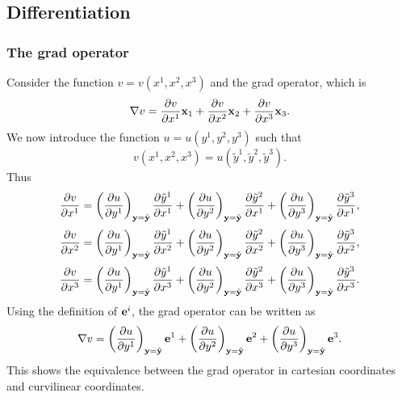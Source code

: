 \documentclass[11pt]{article}
\newcommand{\ytilde}{\tilde{y}}
\begin{document}
\subsection{Differentiation}
\subsubsection{The grad operator}
Consider the function $v = v(x^1, x^2, x^3)$ and the grad operator, which is  
\begin{equation}
    \nabla v = \frac{\partial v}{\partial x^1} \mathbf{x}_1 + \frac{\partial v}{\partial x^2} \mathbf{x}_2 + \frac{\partial v}{\partial x^3} \mathbf{x}_3.
\end{equation}
We now introduce the function $u = u(y^1,y^2,y^3)$ such that 
\begin{equation}
    v(x^1, x^2, x^3) = u(\ytilde^1, \ytilde^2, \ytilde^3).
\end{equation}
Thus
\begin{equation}
    \frac{\partial v}{\partial x^1} 
    = \left( \frac{ \partial u}{\partial y^1} \right)_{\yvec = \tilde{\yvec}} \frac{\partial \ytilde^1}{\partial x^1} 
    + \left( \frac{ \partial u}{\partial y^2} \right)_{\yvec = \tilde{\yvec}} \frac{\partial \ytilde^2}{\partial x^1} 
    + \left( \frac{ \partial u}{\partial y^3} \right)_{\yvec = \tilde{\yvec}} \frac{\partial \ytilde^3}{\partial x^1}, 
\end{equation}
\begin{equation}
    \frac{\partial v}{\partial x^2} 
    = \left( \frac{ \partial u}{\partial y^1} \right)_{\yvec = \tilde{\yvec}} \frac{\partial \ytilde^1}{\partial x^2} 
    + \left( \frac{ \partial u}{\partial y^2} \right)_{\yvec = \tilde{\yvec}} \frac{\partial \ytilde^2}{\partial x^2} 
    + \left( \frac{ \partial u}{\partial y^3} \right)_{\yvec = \tilde{\yvec}} \frac{\partial \ytilde^3}{\partial x^2},
\end{equation}
\begin{equation}
    \frac{\partial v}{\partial x^3} 
    = \left( \frac{ \partial u}{\partial y^1} \right)_{\yvec = \tilde{\yvec}} \frac{\partial \ytilde^1}{\partial x^3} 
    + \left( \frac{ \partial u}{\partial y^2} \right)_{\yvec = \tilde{\yvec}} \frac{\partial \ytilde^2}{\partial x^3} 
    + \left( \frac{ \partial u}{\partial y^3} \right)_{\yvec = \tilde{\yvec}} \frac{\partial \ytilde^3}{\partial x^3} .
\end{equation}
Using the definition of $\mathbf{e}^i$, the grad operator can be written as
\begin{equation}
    \label{eq:generic_gradient}
    \nabla v = \left ( \frac{\partial u }{\partial y^1} \right )_{\mathbf{y} = \tilde{\mathbf{y}}} \mathbf{e}^1 + \left ( \frac{\partial u }{\partial y^2} \right )_{\mathbf{y} = \tilde{\mathbf{y}}} \mathbf{e}^2 + \left ( \frac{\partial u }{\partial y^3} \right )_{\mathbf{y} = \tilde{\mathbf{y}}} \mathbf{e}^3 .
\end{equation}
This shows the equivalence between the grad operator in cartesian coordinates and curvilinear coordinates.
\end{document}
